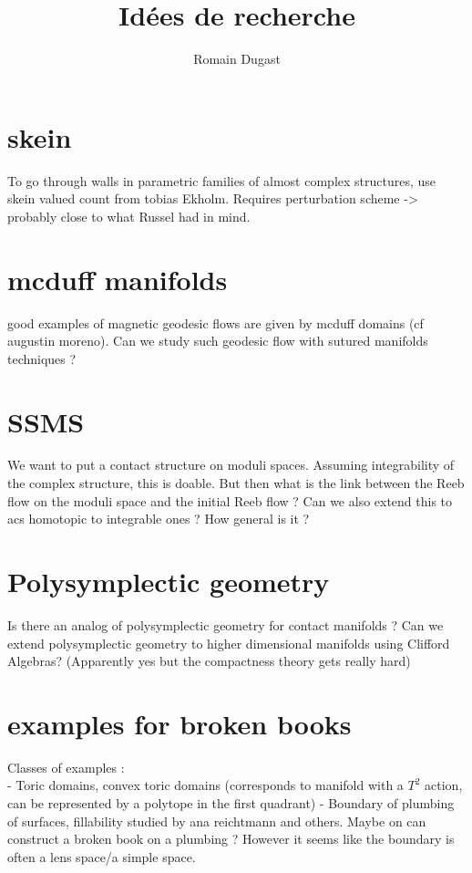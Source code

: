 \documentclass[a4paper,11pt]{article}
\begin{document}
\title{Idées de recherche}
\author{Romain Dugast}
\maketitle


\section{skein}

To go through walls in parametric families of almost complex structures, use skein valued count from tobias Ekholm.
Requires perturbation scheme -> probably close to what Russel had in mind.


\section{mcduff manifolds}

good examples of magnetic geodesic flows are given by mcduff domains (cf augustin moreno). Can we study such geodesic flow with sutured manifolds techniques ?


\section{SSMS}

We want to put a contact structure on moduli spaces. Assuming integrability of the complex
structure, this is doable. But then what is the link between the Reeb flow on the moduli space and the initial Reeb flow ?
Can we also extend this to acs homotopic to integrable ones ? How general is it ?

\section{Polysymplectic geometry}

Is there an analog of polysymplectic geometry for contact manifolds ?
Can we extend polysymplectic geometry to higher dimensional manifolds using Clifford Algebras? (Apparently yes but the compactness theory gets really hard)

\section{examples for broken books}

Classes of examples :\\
- Toric domains, convex toric domains (corresponds to manifold with a $T^2$ action,
can be represented by a polytope in the first quadrant)
- Boundary of plumbing of surfaces, fillability studied by ana reichtmann and others. 
Maybe on can construct a broken book on a plumbing ? 
However it seems like the boundary is often a lens space/a simple space.
\end{document}
